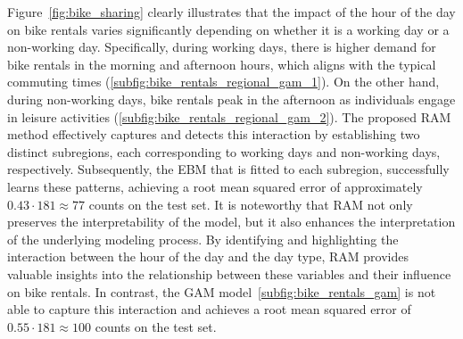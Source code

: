 \documentclass[12pt]{article}
\begin{document}
Figure~\ref{fig:bike_sharing} clearly illustrates that the impact of the hour of the day on bike rentals varies
significantly depending on whether it is a working day or a non-working day.
Specifically, during working days, there is higher demand for bike rentals in the morning and afternoon hours,
which aligns with the typical commuting times (\ref{subfig:bike_rentals_regional_gam_1}).
On the other hand, during non-working days, bike rentals peak in the afternoon as individuals engage in
leisure activities (\ref{subfig:bike_rentals_regional_gam_2}).
The proposed RAM method effectively captures and detects this interaction by establishing two distinct subregions,
each corresponding to working days and non-working days, respectively.
Subsequently, the EBM that is fitted to each subregion, successfully learns these patterns,
achieving a root mean squared error of approximately \( 0.43 \cdot 181 \approx 77\) counts on the test set.
It is noteworthy that RAM not only preserves the interpretability of the model,
but it also enhances the interpretation of the underlying modeling process.
By identifying and highlighting the interaction between the hour of the day and the day type,
RAM provides valuable insights into the relationship between these variables and their influence on bike rentals.
In contrast, the GAM model~\ref{subfig:bike_rentals_gam} is not able to capture this interaction and
achieves a root mean squared error of \( 0.55 \cdot 181 \approx 100\) counts on the test set.
\end{document}
